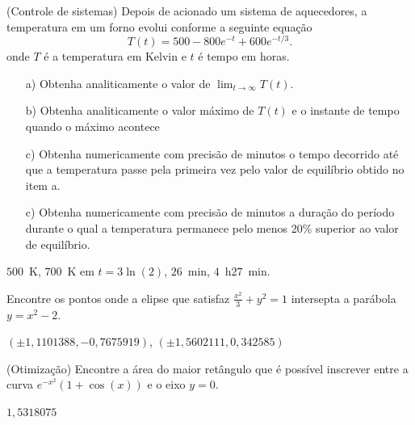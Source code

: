 \begin{exer}(Controle de sistemas) Depois de acionado um sistema de aquecedores, a temperatura em um forno  evolui conforme a seguinte equação
\begin{equation} T(t)=500-800e^{-t}+600e^ {-t/3}. \end{equation}
onde $T$ é a temperatura em Kelvin e $t$ é tempo em horas.
\begin{itemize}
\item[a)] Obtenha analiticamente o valor de $\lim_{t\to\infty}T(t)$.
\item[b)] Obtenha analiticamente o valor máximo de $T(t)$ e o instante de tempo quando o máximo acontece
\item[c)] Obtenha numericamente com precisão de minutos o tempo decorrido até que a temperatura passe pela primeira vez pelo valor de equilíbrio obtido no item a.
\item[c)] Obtenha numericamente com precisão de minutos a duração do período durante o qual a temperatura permanece pelo menos 20\% superior ao valor de equilíbrio.
\end{itemize}
\end{exer}

\begin{resp}

$500$~K, $700$~K em $t=3\ln(2)$, $26$~min, $4$~h$27$~min.

\end{resp}

\begin{exer} Encontre os pontos onde a elipse que satisfaz $\frac{x^2}{3}+y^2=1$ intersepta a parábola $y=x^2-2$.
\end{exer}
\begin{resp}

$\left(\pm 1,1101388, -0,7675919\right)$, $\left(\pm 1,5602111, 0,342585\right)$

\end{resp}

\begin{exer}(Otimização) Encontre a área do maior retângulo que é possível inscrever entre a curva $e^{-x^2}\left(1+\cos(x)\right)$ e o eixo $y=0$.
\end{exer}
\begin{resp}

$1,5318075$

\end{resp}


